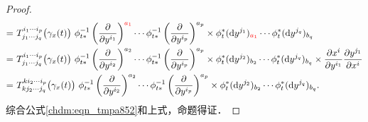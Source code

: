 \begin{proof}
\begin{equation*}
\begin{aligned}
        =& \ T^{i_1 \cdots i_p}_{j_1\cdots j_q}\bigl(\gamma_x(t)\bigr) \ 
        \phi_{t*} ^{-1}  \left(\frac{\partial }{\partial y^{i_1}}\right)^{\color{red} a_1} \cdots 
        \phi_{t*} ^{-1} \left(\frac{\partial }{\partial y^{i_p}}\right)^{a_p} 
         \times \phi_{t}^{*}({\rm d}y^{j_1})_{\color{red} a_1} \cdots \phi_{t}^{*} ({\rm d}y^{j_q})_{b_q}  \\
         =& \ T^{i_1 \cdots i_p}_{j_1\cdots j_q}\bigl(\gamma_x(t)\bigr) \ 
        \phi_{t*} ^{-1}  \left(\frac{\partial }{\partial y^{i_2}}\right)^{ a_2} \cdots 
        \phi_{t*} ^{-1} \left(\frac{\partial }{\partial y^{i_p}}\right)^{a_p} 
         \times \phi_{t}^{*}({\rm d}y^{j_2})_{b_2} \cdots \phi_{t}^{*} ({\rm d}y^{j_q})_{b_q}  
        \times \frac{\partial x^i}{\partial y^{i_1} }
        \frac{{\partial {y^{j_1} }}}{{\partial {x^i}}}  \\
        =& \ T^{k i_2 \cdots i_p}_{k j_2\cdots j_q}\bigl(\gamma_x(t)\bigr) \ 
        \phi_{t*} ^{-1}  \left(\frac{\partial }{\partial y^{i_2}}\right)^{ a_2} \cdots 
        \phi_{t*} ^{-1} \left(\frac{\partial }{\partial y^{i_p}}\right)^{a_p} 
         \times \phi_{t}^{*}({\rm d}y^{j_2})_{b_2} \cdots \phi_{t}^{*} ({\rm d}y^{j_q})_{b_q}  .
    \end{aligned}
\end{equation*}
综合公式\eqref{chdm:eqn_tmpa852}和上式，命题得证．
\end{proof}


